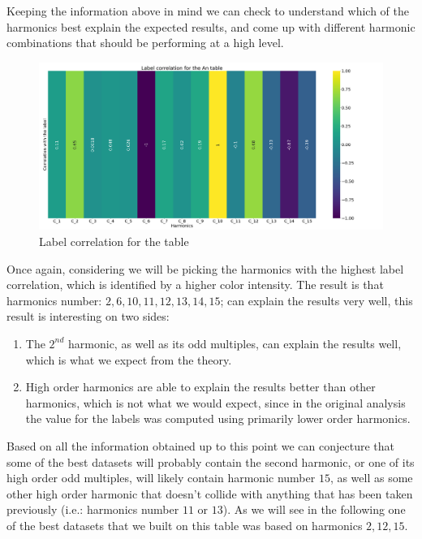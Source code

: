 Keeping the information above in mind we can check  to understand which of the
harmonics best explain the expected results, and come up with different harmonic combinations that
should be performing at a high level.

\begin{figure}
	\centering
	\includegraphics[width=\linewidth]{img/An_label_corr.png}
	\caption{Label correlation for the \an table} \label{fig:an-lcorr}
\end{figure}

Once again, considering  we will be picking the harmonics with the highest label
correlation, which is identified by a higher color intensity. The result
is that harmonics number: $2, 6, 10, 11, 12, 13, 14, 15$; can explain the results very well, this
result is interesting on two sides:
\begin{enumerate}
	\item The $2^{nd}$ harmonic, as well as its odd multiples, can explain the results well, which
	      is what we expect from the theory.
	\item High order harmonics are able to explain the results better than other harmonics,
	      which is not what we would expect, since in the original analysis the value for the
	      labels was computed using primarily lower order harmonics.
\end{enumerate}
Based on all the information obtained up to this point we can conjecture that some of the best
datasets will probably contain the second harmonic, or one of its high order odd multiples, will
likely contain harmonic number $15$, as well as some other high order harmonic that doesn't collide
with anything that has been taken previously (i.e.: harmonics number $11$ or $13$). As we will see
in the following one of the best datasets that we built on this table was based on harmonics $2, 12,
	15$.

